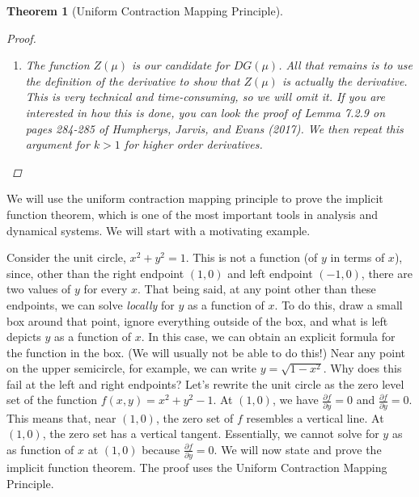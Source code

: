 \documentclass[12pt]{amsart}         %
\newtheorem{theorem}{Theorem}[section]
\theoremstyle{remark}
\begin{document}
\begin{theorem}[Uniform Contraction Mapping Principle]
\begin{proof}
\begin{enumerate}
\item The function $Z(\mu)$ is our candidate for $DG(\mu)$. All that remains is to use the definition of the derivative to show that $Z(\mu)$ is actually the derivative. This is very technical and time-consuming, so we will omit it. If you are interested in how this is done, you can look the proof of Lemma 7.2.9 on pages 284-285 of Humpherys, Jarvis, and Evans (2017). We then repeat this argument for $k > 1$ for higher order derivatives.
\end{enumerate}

\end{proof}
\end{theorem}

We will use the uniform contraction mapping principle to prove the implicit function theorem, which is one of the most important tools in analysis and dynamical systems. We will start with a motivating example.

Consider the unit circle, $x^2 + y^2 = 1$. This is not a function (of $y$ in terms of $x$), since, other than the right endpoint $(1, 0)$ and left endpoint $(-1, 0)$, there are two values of $y$ for every $x$. That being said, at any point other than these endpoints, we can solve \emph{locally} for $y$ as a function of $x$. To do this, draw a small box around that point, ignore everything outside of the box, and what is left depicts $y$ as a function of $x$. In this case, we can obtain an explicit formula for the function in the box. (We will usually not be able to do this!) Near any point on the upper semicircle, for example, we can write $y = \sqrt{1 - x^2}$. Why does this fail at the left and right endpoints? Let's rewrite the unit circle as the zero level set of the function $f(x, y) = x^2 + y^2 - 1$. At $(1, 0)$, we have $\frac{\partial f}{\partial y} = 0$ and $\frac{\partial f}{\partial y} = 0$. This means that, near $(1,0)$, the zero set of $f$ resembles a vertical line. At $(1,0)$, the zero set has a vertical tangent. Essentially, we cannot solve for $y$ as as function of $x$ at $(1,0)$ because $\frac{\partial f}{\partial y} = 0$. We will now state and prove the implicit function theorem. The proof uses the Uniform Contraction Mapping Principle.
\end{document}
